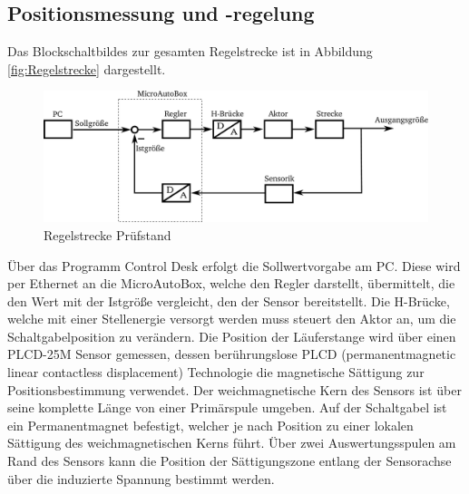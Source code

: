 \subsection {Positionsmessung und -regelung}\label{regler}

Das Blockschaltbildes zur gesamten Regelstrecke ist in Abbildung \autoref{fig:Regelstrecke} dargestellt.
\begin{figure}[h]
	\centering
		\includegraphics[width=0.95\columnwidth]{Bilder/Schaltgabelregelung.pdf}
	\caption{Regelstrecke Prüfstand}
	\label{fig:Regelstrecke}
\end{figure} \noindent
Über das Programm Control Desk erfolgt die Sollwertvorgabe am PC. Diese wird per Ethernet an die MicroAutoBox, welche den Regler darstellt, übermittelt, die den Wert mit der Istgröße vergleicht, den der Sensor bereitstellt. Die H-Brücke, welche mit einer Stellenergie versorgt werden muss steuert den Aktor an, um die Schaltgabelposition zu verändern.
Die Position der Läuferstange wird über einen PLCD-25M Sensor gemessen, dessen berührungslose PLCD (permanentmagnetic linear contactless displacement) Technologie die magnetische Sättigung zur Positionsbestimmung verwendet. Der weichmagnetische Kern des Sensors ist über seine komplette Länge von einer Primärspule umgeben. Auf der Schaltgabel ist ein Permanentmagnet befestigt, welcher je nach Position zu einer lokalen Sättigung des weichmagnetischen Kerns führt. Über zwei Auswertungsspulen am Rand des Sensors kann die Position der Sättigungszone entlang der Sensorachse über die induzierte Spannung bestimmt werden.


